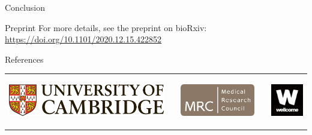 \documentclass[final]{beamer}
\newlength{\onecolwid}
\begin{document}
\begin{frame}[t]
\begin{columns}[t]
\begin{column}{\onecolwid}
\begin{block}{Conclusion}
\end{block}

\begin{alertblock}{Preprint}
For more details, see the preprint on bioRxiv: \\
\small \url{https://doi.org/10.1101/2020.12.15.422852}
\end{alertblock}


\begin{block}{References}

\nocite{*} %
{
}

\end{block}


\begin{center}
\begin{tabular}{ccccc}
\includegraphics[height=22mm]{./Cambridge_University_CMYK.eps} & \hspace{15mm} & \includegraphics[height=22mm]{mrc_logo.jpg} & \hspace{15mm} & \includegraphics[height=22mm]{wellcome-logo-black.jpg}
\end{tabular}
\end{center}


\end{column} %

\end{columns} %

\end{frame} %
\end{document}
